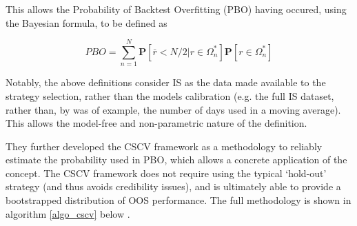 \documentclass[a4paper,11pt,oneside]{article}
\theoremstyle{plain}
\theoremstyle{definition}
\begin{document}
	This allows the Probability of Backtest Overfitting (PBO) having occured, using the Bayesian formula, to be defined as 
	
	\begin{equation}\label{eq:PBO2}
	PBO = \sum_{n=1}^{N}\mathbf{P}[\overline{r} < {N/2}|r\in\Omega_{n}^{*}]\mathbf{P}[r\in\Omega_{n}^{*}]
	\end{equation}
	
	Notably, the above definitions consider IS as the data made available to the strategy selection, rather than the 
	models calibration (e.g. the full IS dataset, rather than, by was of example, the number of days used in a moving average). 
	This allows the model-free and non-parametric nature of the definition. 
	\hfill \break 
	
	They further developed the CSCV framework as a methodology to reliably estimate the probability used in PBO, which allows a concrete application of the concept. The CSCV framework does not require using the typical ‘hold-out’ strategy (and thus avoids credibility issues), and is ultimately able to provide a bootstrapped distribution of OOS performance. The full methodology is shown in algorithm \ref{algo_cscv} below \cite{BailyPBO}.
	\hfill \break 
	
\end{document}
